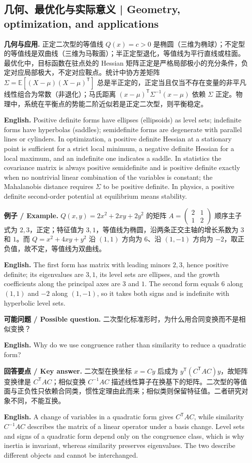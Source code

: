 \documentclass[UTF8,11pt,a4paper]{ctexart}
\newcommand{\EN}[1]{\par\noindent\textbf{English.} #1\par}
\newcommand{\EX}[2]{\par\noindent\textbf{例子 / Example.} #1\par\EN{#2}}
\newcommand{\ASK}[4]{\par\noindent\textbf{可能问题 / Possible question.} #1\par\EN{#2}\noindent\textbf{回答要点 / Key answer.} #3\par\EN{#4}\medskip}
\begin{document}
\subsection{几何、最优化与实际意义 | Geometry, optimization, and applications}
\noindent\textbf{几何与应用.} 正定二次型的等值线 $Q(x)=c>0$ 是椭圆（三维为椭球）；不定型的等值线是双曲线（三维为马鞍面）；半正定型退化，等值线为平行直线或柱面。最优化中，目标函数在驻点处的 Hessian 矩阵正定是严格局部极小的充分条件，负定对应局部极大，不定对应鞍点。统计中协方差矩阵 $\Sigma=\mathbb E[(X-\mu)(X-\mu)^{\mathsf T}]$ 总是半正定的，正定当且仅当不存在变量的非平凡线性组合为常数（非退化）；马氏距离 $(x-\mu)^{\mathsf T}\Sigma^{-1}(x-\mu)$ 依赖 $\Sigma$ 正定。物理中，系统在平衡点的势能二阶近似若是正定二次型，则平衡稳定。
\EN{Positive definite forms have ellipses (ellipsoids) as level sets; indefinite forms have hyperbolas (saddles); semidefinite forms are degenerate with parallel lines or cylinders. In optimization, a positive definite Hessian at a stationary point is sufficient for a strict local minimum, a negative definite Hessian for a local maximum, and an indefinite one indicates a saddle. In statistics the covariance matrix is always positive semidefinite and is positive definite exactly when no nontrivial linear combination of the variables is constant; the Mahalanobis distance requires $\Sigma$ to be positive definite. In physics, a positive definite second-order potential at equilibrium means stability.}
\EX{$Q(x,y)=2x^2+2xy+2y^2$ 的矩阵 $A=\begin{pmatrix}2&1\\1&2\end{pmatrix}$ 顺序主子式为 $2,3$，正定；特征值为 $3,1$，等值线为椭圆，沿两条正交主轴的增长系数为 $3$ 和 $1$。而 $Q=x^2+4xy+y^2$ 沿 $(1,1)$ 方向为 $6$、沿 $(1,-1)$ 方向为 $-2$，取正负值，故不定，等值线为双曲线。}{The first form has matrix with leading minors $2,3$, hence positive definite; its eigenvalues are $3,1$, its level sets are ellipses, and the growth coefficients along the principal axes are $3$ and $1$. The second form equals $6$ along $(1,1)$ and $-2$ along $(1,-1)$, so it takes both signs and is indefinite with hyperbolic level sets.}
\ASK{二次型化标准形时，为什么用合同变换而不是相似变换？}{Why do we use congruence rather than similarity to reduce a quadratic form?}{二次型在换坐标 $x=Cy$ 后成为 $y^{\mathsf T}(C^{\mathsf T}AC)y$，故矩阵变换律是 $C^{\mathsf T}AC$；相似变换 $C^{-1}AC$ 描述线性算子在换基下的矩阵。二次型的等值面与正负性只依赖合同类，惯性定理由此而来；相似类则保留特征值。二者研究对象不同，不能互换。}{A change of variables in a quadratic form gives $C^{\mathsf T}AC$, while similarity $C^{-1}AC$ describes the matrix of a linear operator under a basis change. Level sets and signs of a quadratic form depend only on the congruence class, which is why inertia is invariant, whereas similarity preserves eigenvalues. The two describe different objects and cannot be interchanged.}
\end{document}
